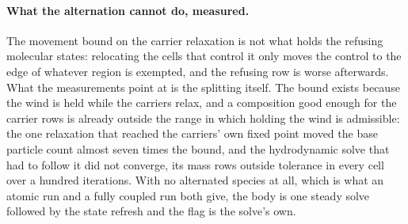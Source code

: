 \paragraph{What the alternation cannot do, measured.}
The movement bound on the carrier relaxation is not what holds the refusing
molecular states: relocating the cells that control it only moves the control
to the edge of whatever region is exempted, and the refusing row is worse
afterwards.  What the measurements point at is the splitting itself. The bound
exists because the wind is held while the carriers relax, and a composition
good enough for the carrier rows is already outside the range in which holding
the wind is admissible: the one relaxation that reached the carriers' own fixed
point moved the base particle count almost seven times the bound, and the
hydrodynamic solve that had to follow it did not converge, its mass rows
outside tolerance in every cell over a hundred iterations.  With no alternated species at
all, which is what an atomic run and a fully coupled run both give, the body
is one steady solve followed by the state refresh and the flag is the solve's
own.
